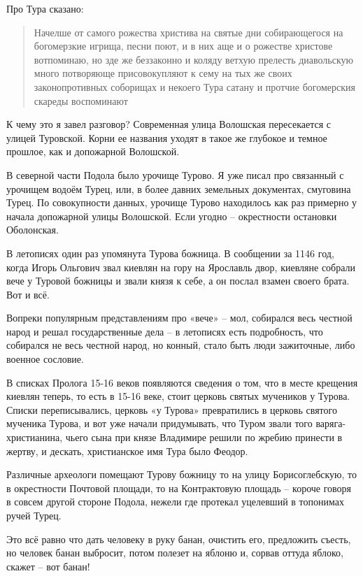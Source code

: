    Про Тура сказано:
 
\begin{quotation}
\noindent Начелше от самого рожества христива на святые дни собирающегося на богомерзкие игрища, песни поют, и в них аще и о рожестве христове вотпоминаю, но зде же беззаконно и коляду ветхую прелесть диавольскую много потворяюще присовокупляют к сему на тых же своих законопротивных соборищах и некоего Тура сатану и протчие богомерския скареды воспоминают
\end{quotation}


   К чему это я завел разговор? Современная улица Волошская пересекается с улицей Туровской. Корни ее названия уходят в такое же глубокое и темное прошлое, как и допожарной Волошской.

   В северной части Подола было урочище Турово. Я уже писал про связанный с урочищем водоём Турец, или, в более давних земельных документах, смуговина Турец. По совокупности данных, урочище Турово находилось как раз примерно у начала допожарной улицы Волошской. Если угодно – окрестности остановки Оболонская.

   В летописях один раз упомянута Турова божница. В сообщении за 1146 год, когда Игорь Ольгович звал киевлян на гору на Ярославль двор, киевляне собрали вече у Туровой  божницы и звали князя к себе, а он послал взамен своего брата. Вот и всё.

Вопреки популярным представлениям про «вече» – мол, собирался весь честной народ и решал государственные дела – в летописях есть подробность, что собирался не весь честной народ, но конный, стало быть люди зажиточные, либо военное сословие.

   В списках Пролога 15-16 веков появляются сведения о том, что в месте крещения киевлян теперь, то есть в 15-16 веке, стоит церковь святых мучеников у Турова. Списки переписывались, церковь «у Турова» превратились в церковь святого мученика Турова, и вот уже начали придумывать, что Туром звали того варяга-христианина, чьего сына при князе Владимире решили по жребию принести в жертву, и дескать, христианское имя Тура было Феодор.

   Различные археологи помещают Турову божницу то на улицу Борисоглебскую, то в окрестности Почтовой площади, то на Контрактовую площадь – короче говоря в совсем другой стороне Подола, нежели где протекал уцелевший в топонимах ручей Турец.

   Это всё равно что дать человеку в руку банан, очистить его, предложить съесть, но человек банан выбросит, потом полезет на яблоню и, сорвав оттуда яблоко, скажет – вот банан!

